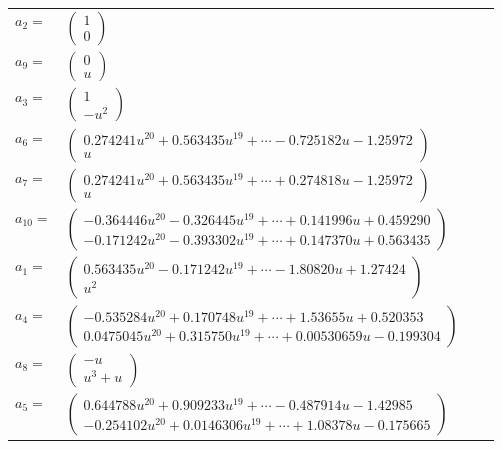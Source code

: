 \documentclass[1p]{elsarticle_modified}
\theoremstyle{definition}
\begin{document}
\begin{tabular}{m{7pt} m{180pt} m{7pt} m{180pt} }
\flushright $a_{2}=$&$\begin{pmatrix}1\\0\end{pmatrix}$ \\
\flushright $a_{9}=$&$\begin{pmatrix}0\\u\end{pmatrix}$ \\
\flushright $a_{3}=$&$\begin{pmatrix}1\\- u^2\end{pmatrix}$ \\
\flushright $a_{6}=$&$\begin{pmatrix}0.274241 u^{20}+0.563435 u^{19}+\cdots-0.725182 u-1.25972\\u\end{pmatrix}$ \\
\flushright $a_{7}=$&$\begin{pmatrix}0.274241 u^{20}+0.563435 u^{19}+\cdots+0.274818 u-1.25972\\u\end{pmatrix}$ \\
\flushright $a_{10}=$&$\begin{pmatrix}-0.364446 u^{20}-0.326445 u^{19}+\cdots+0.141996 u+0.459290\\-0.171242 u^{20}-0.393302 u^{19}+\cdots+0.147370 u+0.563435\end{pmatrix}$ \\
\flushright $a_{1}=$&$\begin{pmatrix}0.563435 u^{20}-0.171242 u^{19}+\cdots-1.80820 u+1.27424\\u^2\end{pmatrix}$ \\
\flushright $a_{4}=$&$\begin{pmatrix}-0.535284 u^{20}+0.170748 u^{19}+\cdots+1.53655 u+0.520353\\0.0475045 u^{20}+0.315750 u^{19}+\cdots+0.00530659 u-0.199304\end{pmatrix}$ \\
\flushright $a_{8}=$&$\begin{pmatrix}- u\\u^3+u\end{pmatrix}$ \\
\flushright $a_{5}=$&$\begin{pmatrix}0.644788 u^{20}+0.909233 u^{19}+\cdots-0.487914 u-1.42985\\-0.254102 u^{20}+0.0146306 u^{19}+\cdots+1.08378 u-0.175665\end{pmatrix}$ \\

\end{tabular}
\end{document}
